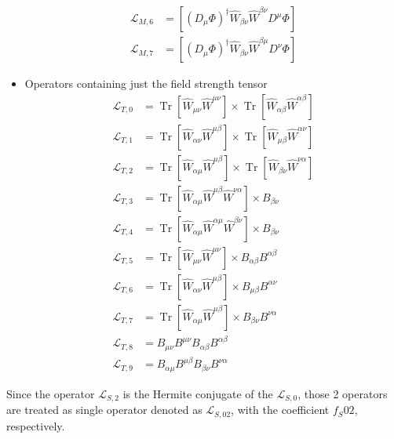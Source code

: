 \begin{itemize}
\begin{equation}
\begin{aligned}
\mathcal{L}_{M, 6} &=\left[\left(D_{\mu} \Phi\right)^{\dagger} \hat{W}_{\beta \nu} \hat{W}^{\beta \nu} D^{\mu} \Phi\right] \\
\mathcal{L}_{M, 7} &=\left[\left(D_{\mu} \Phi\right)^{\dagger} \hat{W}_{\beta \nu} \hat{W}^{\beta \mu} D^{\nu} \Phi\right]
\end{aligned}
\end{equation}
\item Operators containing just the field strength tensor
\begin{equation}
\begin{aligned}
\mathcal{L}_{T, 0} &=\operatorname{Tr}\left[\hat{W}_{\mu \nu} \hat{W}^{\mu \nu}\right] \times \operatorname{Tr}\left[\hat{W}_{\alpha \beta} \hat{W}^{\alpha \beta}\right] \\
\mathcal{L}_{T, 1} &=\operatorname{Tr}\left[\hat{W}_{\alpha \nu} \hat{W}^{\mu \beta}\right] \times \operatorname{Tr}\left[\hat{W}_{\mu \beta} \hat{W}^{\alpha \nu}\right] \\
\mathcal{L}_{T, 2} &=\operatorname{Tr}\left[\hat{W}_{\alpha \mu} \hat{W}^{\mu \beta}\right] \times \operatorname{Tr}\left[\hat{W}_{\beta \nu} \hat{W}^{\nu \alpha}\right] \\
\mathcal{L}_{T, 3} &=\operatorname{Tr}\left[\hat{W}_{\alpha \mu} \hat{W}^{\mu \beta} \hat{W}^{\nu \alpha}\right] \times B_{\beta \nu} \\
\mathcal{L}_{T, 4} &=\operatorname{Tr}\left[\hat{W}_{\alpha \mu} \hat{W}^{\alpha \mu} \hat{W}^{\beta \nu}\right] \times B_{\beta \nu} \\
\mathcal{L}_{T, 5} &=\operatorname{Tr}\left[\hat{W}_{\mu \nu} \hat{W}^{\mu \nu}\right] \times B_{\alpha \beta} B^{\alpha \beta} \\
\mathcal{L}_{T, 6} &=\operatorname{Tr}\left[\hat{W}_{\alpha \nu} \hat{W}^{\mu \beta}\right] \times B_{\mu \beta} B^{\alpha \nu} \\
\mathcal{L}_{T, 7} &=\operatorname{Tr}\left[\hat{W}_{\alpha \mu} \hat{W}^{\mu \beta}\right] \times B_{\beta \nu} B^{\nu \alpha} \\
\mathcal{L}_{T, 8} &=B_{\mu \nu} B^{\mu \nu} B_{\alpha \beta} B^{\alpha \beta} \\
\mathcal{L}_{T, 9} &=B_{\alpha \mu} B^{\mu \beta} B_{\beta \nu} B^{\nu \alpha}
\end{aligned}
\end{equation}
\end{itemize}

Since the operator $\mathcal{L}_{S, 2}$ is the Hermite conjugate of the $\mathcal{L}_{S, 0}$, those 2 operators are treated as single operator denoted as $\mathcal{L}_{S, 02}$, with the coefficient $f_S02$, respectively.

